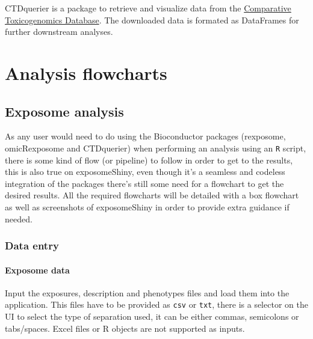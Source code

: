 \documentclass[
]{book}
\begin{document}
CTDquerier is a package to retrieve and visualize data from the \href{http://ctdbase.org/}{Comparative Toxicogenomics Database}. The downloaded data is formated as DataFrames for further downstream analyses.

\hypertarget{analysis-flowcharts}{%
\chapter{Analysis flowcharts}\label{analysis-flowcharts}}

\hypertarget{exposome-analysis}{%
\section{Exposome analysis}\label{exposome-analysis}}

As any user would need to do using the Bioconductor packages (rexposome, omicRexposome and CTDquerier) when performing an analysis using an \texttt{R} script, there is some kind of flow (or pipeline) to follow in order to get to the results, this is also true on exposomeShiny, even though it's a seamless and codeless integration of the packages there's still some need for a flowchart to get the desired results. All the required flowcharts will be detailed with a box flowchart as well as screenshots of exposomeShiny in order to provide extra guidance if needed.

\hypertarget{data-entry}{%
\subsection{Data entry}\label{data-entry}}

\hypertarget{exposome-data}{%
\subsubsection{Exposome data}\label{exposome-data}}

Input the exposures, description and phenotypes files and load them into the application. This files have to be provided as \texttt{csv} or \texttt{txt}, there is a selector on the UI to select the type of separation used, it can be either commas, semicolons or tabs/spaces. Excel files or R objects are not supported as inputs.
\end{document}
